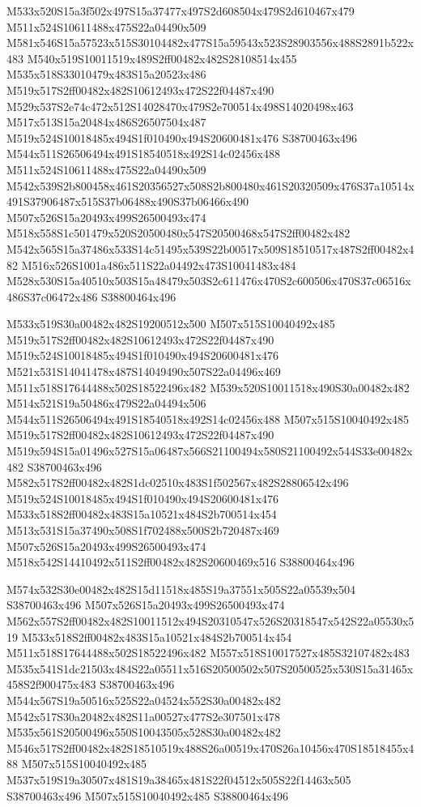 \documentclass{article}
\begin{document}
\begin{multicols}{2}
M533x520S15a3f502x497S15a37477x497S2d608504x479S2d610467x479 M511x524S10611488x475S22a04490x509 M581x546S15a57523x515S30104482x477S15a59543x523S28903556x488S2891b522x483 M540x519S10011519x489S2ff00482x482S28108514x455 M535x518S33010479x483S15a20523x486 M519x517S2ff00482x482S10612493x472S22f04487x490 M529x537S2e74c472x512S14028470x479S2e700514x498S14020498x463 M517x513S15a20484x486S26507504x487 M519x524S10018485x494S1f010490x494S20600481x476 S38700463x496 M544x511S26506494x491S18540518x492S14c02456x488 M511x524S10611488x475S22a04490x509 M542x539S2b800458x461S20356527x508S2b800480x461S20320509x476S37a10514x491S37906487x515S37b06488x490S37b06466x490 M507x526S15a20493x499S26500493x474 M518x558S1c501479x520S20500480x547S20500468x547S2ff00482x482 M542x565S15a37486x533S14c51495x539S22b00517x509S18510517x487S2ff00482x482 M516x526S1001a486x511S22a04492x473S10041483x484 M528x530S15a40510x503S15a48479x503S2c611476x470S2c600506x470S37c06516x486S37c06472x486 S38800464x496

M533x519S30a00482x482S19200512x500 M507x515S10040492x485 M519x517S2ff00482x482S10612493x472S22f04487x490 M519x524S10018485x494S1f010490x494S20600481x476 M521x531S14041478x487S14049490x507S22a04496x469 M511x518S17644488x502S18522496x482 M539x520S10011518x490S30a00482x482 M514x521S19a50486x479S22a04494x506 M544x511S26506494x491S18540518x492S14c02456x488 M507x515S10040492x485 M519x517S2ff00482x482S10612493x472S22f04487x490 M519x594S15a01496x527S15a06487x566S21100494x580S21100492x544S33e00482x482 S38700463x496 M582x517S2ff00482x482S1dc02510x483S1f502567x482S28806542x496 M519x524S10018485x494S1f010490x494S20600481x476 M533x518S2ff00482x483S15a10521x484S2b700514x454 M513x531S15a37490x508S1f702488x500S2b720487x469 M507x526S15a20493x499S26500493x474 M518x542S14410492x511S2ff00482x482S20600469x516 S38800464x496

M574x532S30e00482x482S15d11518x485S19a37551x505S22a05539x504 S38700463x496 M507x526S15a20493x499S26500493x474 M562x557S2ff00482x482S10011512x494S20310547x526S20318547x542S22a05530x519 M533x518S2ff00482x483S15a10521x484S2b700514x454 M511x518S17644488x502S18522496x482 M557x518S10017527x485S32107482x483 M535x541S1dc21503x484S22a05511x516S20500502x507S20500525x530S15a31465x458S2f900475x483 S38700463x496 M544x567S19a50516x525S22a04524x552S30a00482x482 M542x517S30a20482x482S11a00527x477S2e307501x478 M535x561S20500496x550S10043505x528S30a00482x482 M546x517S2ff00482x482S18510519x488S26a00519x470S26a10456x470S18518455x488 M507x515S10040492x485 M537x519S19a30507x481S19a38465x481S22f04512x505S22f14463x505 S38700463x496 M507x515S10040492x485 S38800464x496


\end{multicols}
\end{document}
